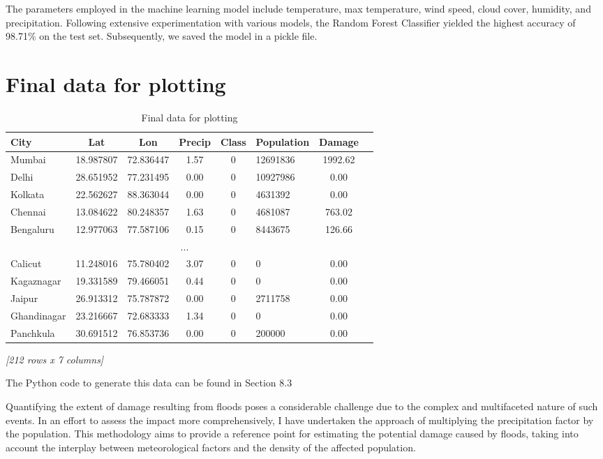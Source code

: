 \documentclass[a4paper,12pt]{report}
\begin{document}
The parameters employed in the machine learning model include temperature, max temperature, wind speed, cloud cover, humidity, and precipitation. Following extensive experimentation with various models, the Random Forest Classifier yielded the highest accuracy of 98.71\% on the test set. Subsequently, we saved the model in a pickle file.

\section{Final data for plotting}

\begin{table}[ht]
\centering
\begin{center}
\begin{longtable}{lcccclcr}
\toprule
\textbf{City} & \textbf{Lat} & \textbf{Lon} & \textbf{Precip} & \textbf{Class} & \textbf{Population} & \textbf{Damage} \\
\midrule
Mumbai & 18.987807 & 72.836447 & 1.57 & 0 & 12691836 & 1992.62 \\
Delhi & 28.651952 & 77.231495 & 0.00 & 0 & 10927986 & 0.00 \\
Kolkata & 22.562627 & 88.363044 & 0.00 & 0 & 4631392 & 0.00 \\
Chennai & 13.084622 & 80.248357 & 1.63 & 0 & 4681087 & 763.02 \\
Bengaluru & 12.977063 & 77.587106 & 0.15 & 0 & 8443675 & 126.66 \\
\multicolumn{7}{c}{...} \\
Calicut & 11.248016 & 75.780402 & 3.07 & 0 & 0 & 0.00 \\
Kagaznagar & 19.331589 & 79.466051 & 0.44 & 0 & 0 & 0.00 \\
Jaipur & 26.913312 & 75.787872 & 0.00 & 0 & 2711758 & 0.00 \\
Ghandinagar & 23.216667 & 72.683333 & 1.34 & 0 & 0 & 0.00 \\
Panchkula & 30.691512 & 76.853736 & 0.00 & 0 & 200000 & 0.00 \\
\bottomrule
\end{longtable}
\small\textit{[212 rows x 7 columns]}
\end{center}
\caption{Final data for plotting}
\end{table}

The Python code to generate this data can be found in Section 8.3

Quantifying the extent of damage resulting from floods poses a considerable challenge due to the complex and multifaceted nature of such events. In an effort to assess the impact more comprehensively, I have undertaken the approach of multiplying the precipitation factor by the population. This methodology aims to provide a reference point for estimating the potential damage caused by floods, taking into account the interplay between meteorological factors and the density of the affected population. 
\end{document}
